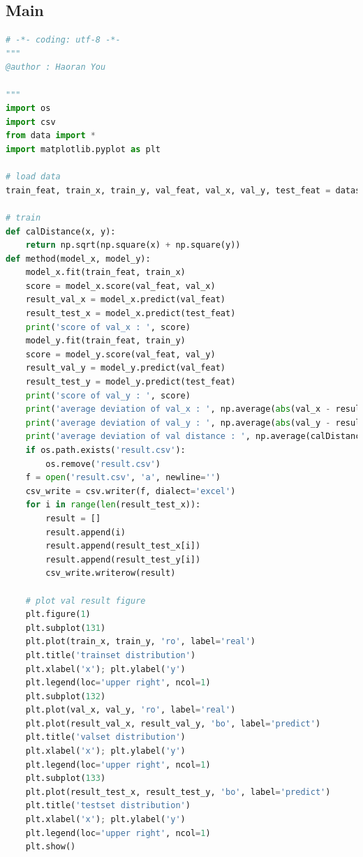 \documentclass[UTF-8, a4paper, 10pt]{article}
\numberwithin{equation}{section}
\begin{document}
\subsection{Main}
\begin{lstlisting}[language=python]
# -*- coding: utf-8 -*-
"""
@author : Haoran You

"""
import os
import csv
from data import *
import matplotlib.pyplot as plt

# load data
train_feat, train_x, train_y, val_feat, val_x, val_y, test_feat = dataset()

# train
def calDistance(x, y):
    return np.sqrt(np.square(x) + np.square(y))
def method(model_x, model_y):
    model_x.fit(train_feat, train_x)
    score = model_x.score(val_feat, val_x)
    result_val_x = model_x.predict(val_feat)
    result_test_x = model_x.predict(test_feat)
    print('score of val_x : ', score)
    model_y.fit(train_feat, train_y)
    score = model_y.score(val_feat, val_y)
    result_val_y = model_y.predict(val_feat)
    result_test_y = model_y.predict(test_feat)
    print('score of val_y : ', score)
    print('average deviation of val_x : ', np.average(abs(val_x - result_val_x)))
    print('average deviation of val_y : ', np.average(abs(val_y - result_val_y)))
    print('average deviation of val distance : ', np.average(calDistance(val_x - result_val_x, val_y - result_val_y)))
    if os.path.exists('result.csv'):
        os.remove('result.csv')
    f = open('result.csv', 'a', newline='')
    csv_write = csv.writer(f, dialect='excel')
    for i in range(len(result_test_x)):
        result = []
        result.append(i)
        result.append(result_test_x[i])
        result.append(result_test_y[i])
        csv_write.writerow(result)

    # plot val result figure
    plt.figure(1)
    plt.subplot(131)
    plt.plot(train_x, train_y, 'ro', label='real')
    plt.title('trainset distribution')
    plt.xlabel('x'); plt.ylabel('y')
    plt.legend(loc='upper right', ncol=1)
    plt.subplot(132)
    plt.plot(val_x, val_y, 'ro', label='real')
    plt.plot(result_val_x, result_val_y, 'bo', label='predict')
    plt.title('valset distribution')
    plt.xlabel('x'); plt.ylabel('y')
    plt.legend(loc='upper right', ncol=1)
    plt.subplot(133)
    plt.plot(result_test_x, result_test_y, 'bo', label='predict')
    plt.title('testset distribution')
    plt.xlabel('x'); plt.ylabel('y')
    plt.legend(loc='upper right', ncol=1)
    plt.show()


\end{lstlisting}
\end{document}
